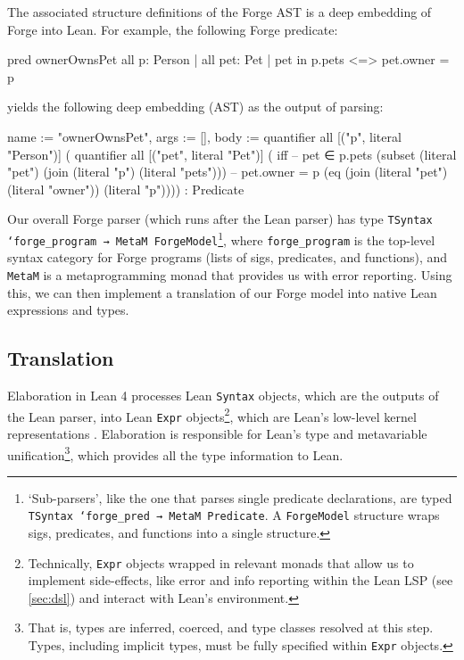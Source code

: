 The associated structure definitions of the Forge AST is a deep embedding of Forge into Lean. For example, the following Forge predicate:
\begin{forge*}
pred ownerOwnsPet {
  all p: Person | all pet: Pet | { pet in p.pets <=> pet.owner = p }
}
\end{forge*}
yields the following deep embedding (AST) as the output of parsing:
\begin{leanimpl*}
{
  name := "ownerOwnsPet",
  args := [],
  body := quantifier all [("p", literal "Person")] (
    quantifier all [("pet", literal "Pet")] (
      iff
      -- pet ∈ p.pets
      (subset (literal "pet") (join (literal "p") (literal "pets")))
      -- pet.owner = p
      (eq (join (literal "pet") (literal "owner")) (literal "p"))))
  : Predicate
}
\end{leanimpl*}

Our overall Forge parser (which runs after the Lean parser) has type \texttt{TSyntax `forge_program → MetaM ForgeModel}\footnote{`Sub-parsers', like the one that parses single predicate declarations, are typed \texttt{TSyntax `forge_pred → MetaM Predicate}. A \texttt{ForgeModel} structure wraps sigs, predicates, and functions into a single structure. }, where \texttt{forge_program} is the top-level syntax category for Forge programs (lists of sigs, predicates, and functions), and \texttt{MetaM} is a metaprogramming monad that provides us with error reporting. Using this, we can then implement a translation of our Forge model into native Lean expressions and types. 

\subsection{Translation}\label{sec:elaboration}

Elaboration in Lean 4 processes Lean \texttt{Syntax} objects, which are the outputs of the Lean parser, into Lean \texttt{Expr} objects\footnote{Technically, \texttt{Expr} objects wrapped in relevant monads that allow us to implement side-effects, like error and info reporting within the Lean LSP (see \cref{sec:dsl}) and interact with Lean's environment.}, which are Lean's low-level kernel representations \cite{metaprogramming}. Elaboration is responsible for Lean's type and metavariable unification\footnote{That is, types are inferred, coerced, and type classes resolved at this step. Types, including implicit types, must be fully specified within \texttt{Expr} objects.}, which provides all the type information to Lean. 


